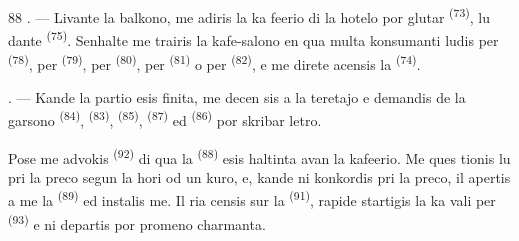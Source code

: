 \begin{VUpage}[90]{88}
. --- Livante la balkono, me adiris la ka\cc
feerio di la hotelo por glutar  \textsuperscript{(73)}, lu\cc
dante  \textsuperscript{(75)}. Senhalte me trairis\nl
la kafe-salono en qua multa konsumanti ludis\nl
per  \textsuperscript{(78)}, per  \textsuperscript{(79)}, per \cc
{} \textsuperscript{(80)}, per  \textsuperscript{(81)} o per  \textsuperscript{(82)}, e me\nl
direte acensis la  \textsuperscript{(74)}.

. --- Kande la partio esis finita, me decen\cc
sis a la teretajo e demandis de la garsono \cc
{} \textsuperscript{(84)},  \textsuperscript{(83)},  \textsuperscript{(85)}, \cc
{} \textsuperscript{(87)} ed  \textsuperscript{(86)} por skribar letro.

\VUblancAlinea
Pose me advokis  \textsuperscript{(92)} di qua la \cc
{} \textsuperscript{(88)} esis haltinta avan la kafeerio. Me ques\cc
tionis lu pri la preco segun la hori od un kuro,\nl
e, kande ni konkordis pri la preco, il apertis\nl
a me la  \textsuperscript{(89)} ed instalis me. Il ria\cc
censis sur la  \textsuperscript{(91)}, rapide startigis la ka\cc
vali per  \textsuperscript{(93)} e ni departis por promeno\nl
charmanta.

\VUsaut{6.0mm}
\VUfilet{22mm}
\end{VUpage}

